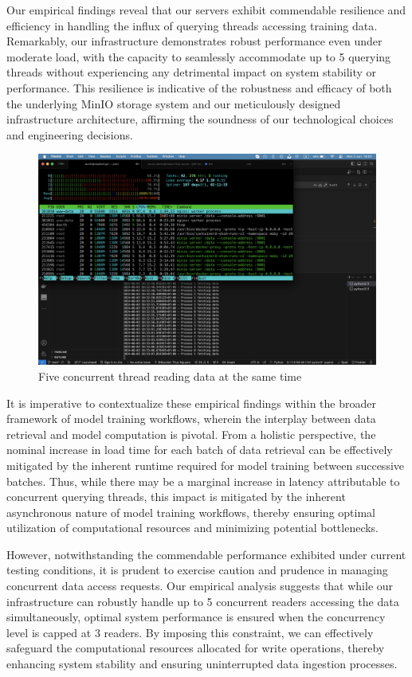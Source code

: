 Our empirical findings reveal that our servers exhibit commendable resilience
and efficiency in handling the influx of querying threads accessing training
data. Remarkably, our infrastructure demonstrates robust performance even under
moderate load, with the capacity to seamlessly accommodate up to 5 querying
threads without experiencing any detrimental impact on system stability or
performance. This resilience is indicative of the robustness and efficacy of
both the underlying MinIO storage system and our meticulously designed
infrastructure architecture, affirming the soundness of our technological
choices and engineering decisions.

\begin{figure}[H]
    \centering
    \includegraphics[width=0.8\linewidth]{Images/5-read-5-process-at-once.png}
    \vspace{1cm}
    \caption{Five concurrent thread reading data at the same time}
    \label{fig:concurrent-read}
\end{figure}

It is imperative to contextualize these empirical findings within the broader
framework of model training workflows, wherein the interplay between data
retrieval and model computation is pivotal. From a holistic perspective, the
nominal increase in load time for each batch of data retrieval can be
effectively mitigated by the inherent runtime required for model training
between successive batches. Thus, while there may be a marginal increase in
latency attributable to concurrent querying threads, this impact is mitigated by
the inherent asynchronous nature of model training workflows, thereby ensuring
optimal utilization of computational resources and minimizing potential
bottlenecks.

However, notwithstanding the commendable performance exhibited under current
testing conditions, it is prudent to exercise caution and prudence in managing
concurrent data access requests. Our empirical analysis suggests that while our
infrastructure can robustly handle up to 5 concurrent readers accessing the data
simultaneously, optimal system performance is ensured when the concurrency level
is capped at 3 readers. By imposing this constraint, we can effectively
safeguard the computational resources allocated for write operations, thereby
enhancing system stability and ensuring uninterrupted data ingestion processes.


